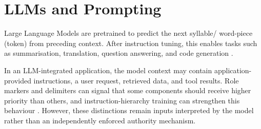 \section{LLMs and Prompting}
\label{sec:llms}

Large Language Models are pretrained to predict the next syllable/ word-piece (token) from preceding context.
After instruction tuning, this enables tasks such as summarisation, translation,
question answering, and code generation
\parencites{brown2020language}{chen2025struq}.

In an LLM-integrated application, the model context may contain
application-provided instructions, a user request, retrieved data, and tool
results. Role markers and delimiters can signal that some components should
receive higher priority than others, and instruction-hierarchy training can
strengthen this behaviour
\parencite{wallace2024instruction}. However, these distinctions remain inputs
interpreted by the model rather than an independently enforced authority
mechanism.